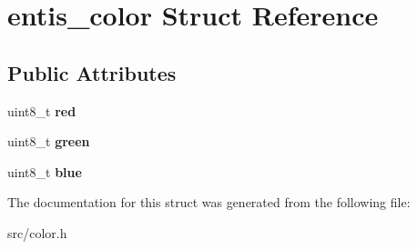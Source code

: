 \hypertarget{structentis__color}{}\section{entis\+\_\+color Struct Reference}
\label{structentis__color}
\subsection*{Public Attributes}
\begin{DoxyCompactItemize}
\item 
\mbox{\label{structentis__color_ac440b1c95bafd6783a7952fecb1145d4}} 
uint8\+\_\+t {\bfseries red}
\item 
\mbox{\label{structentis__color_a68c2841cb3d90e05495b39efd454c081}} 
uint8\+\_\+t {\bfseries green}
\item 
\mbox{\label{structentis__color_a3d303530e1f114708d5c93a799dec252}} 
uint8\+\_\+t {\bfseries blue}
\end{DoxyCompactItemize}


The documentation for this struct was generated from the following file\+:\begin{DoxyCompactItemize}
\item 
src/color.\+h\end{DoxyCompactItemize}

